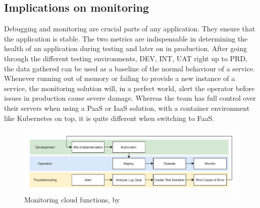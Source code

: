 \documentclass[11pt]{article}
\begin{document}
\subsection{Implications on monitoring}
Debugging and monitoring are crucial parts of any application. They ensure that the application is stable. The two metrics are indispensable in determining the health of an application during testing and later on in production. After going through the different testing environments, DEV, INT, UAT right up to PRD, the data gathered can be used as a baseline of the normal behaviour of a service. Whenever running out of memory or failing to provide a new instance of a service, the monitoring solution will, in a perfect world, alert the operator before issues in production cause severe damage. Whereas the team has full control over their servers when using a PaaS or IaaS solution, with a container environment like Kubernetes on top, it is quite different when switching to FaaS.
\begin{figure}[H]
\caption{Monitoring cloud functions, by \cite{manner2019troubleshooting}}
\label{fig:manner}
\centering
\includegraphics[width=1\textwidth]{monitoring}
\end{figure}
\end{document}
